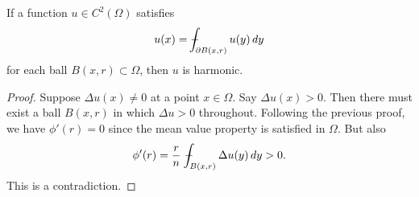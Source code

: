 \begin{theorem}
If a function $u \in C^2(\Omega)$ satisfies
\[u(x) = \dashint_{\partial B(x,r)} u(y)\,dy\]
for each ball $B(x,r) \subset \Omega$, then $u$ is harmonic.
\begin{proof}
Suppose $\Delta u(x) \neq 0$ at a point $x \in \Omega$. Say $\Delta u(x) > 0$. Then there must exist a ball $B(x,r)$ in which $\Delta u > 0$ throughout. Following the previous proof, we have $\phi'(r) = 0$ since the mean value property is satisfied in $\Omega$. But also
\[\phi'(r) = \frac{r}{n}\ \dashint_{B(x,r)} \Delta u(y)\,dy > 0.\]
This is a contradiction.
\end{proof}
\end{theorem}
